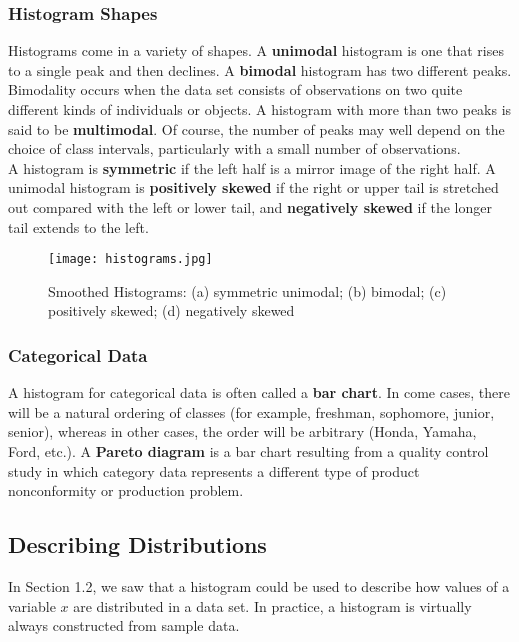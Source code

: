 \documentclass{article}
\begin{document}
		\subsubsection{Histogram Shapes}
		Histograms come in a variety of shapes. A \textbf{unimodal} histogram is one that rises to 
		a single peak and then declines. A \textbf{bimodal} histogram has two different peaks. 
		Bimodality occurs when the data set consists of observations on two quite different kinds 
		of individuals or objects. A histogram with more than two peaks is said to be 
		\textbf{multimodal}. Of course, the number of peaks may well depend on the choice of 
		class intervals, particularly with a small number of observations. \\
		
		A histogram is \textbf{symmetric} if the left half is a mirror image of the right half. A 
		unimodal histogram is \textbf{positively skewed} if the right or upper tail is stretched out 
		compared with the left or lower tail, and \textbf{negatively skewed} if the longer tail extends 
		to the left.
		
		\begin{figure}[!htb]
		   \centering
		   \texttt{[image: histograms.jpg]} 
		   \caption{Smoothed Histograms: (a) symmetric unimodal; (b) bimodal; (c) positively 
		   	skewed; (d) negatively skewed}
		   \label{fig:histograms}
		\end{figure}	
		
		\subsubsection{Categorical Data}
		A histogram for categorical data is often called a \textbf{bar chart}. In come cases, there 
		will be a natural ordering of classes (for example, freshman, sophomore, junior, senior), 
		whereas in other cases, the order will be arbitrary (Honda, Yamaha, Ford, etc.). A 
		\textbf{Pareto diagram} is a bar chart resulting from a quality control study in which 
		category data represents a different type of product nonconformity or production problem.
	
	\subsection{Describing Distributions} %
	In Section 1.2, we saw that a histogram could be used to describe how values of a variable $x$ 
	are distributed in a data set. In practice, a histogram is virtually always constructed from sample 
	data.
	
\end{document}
